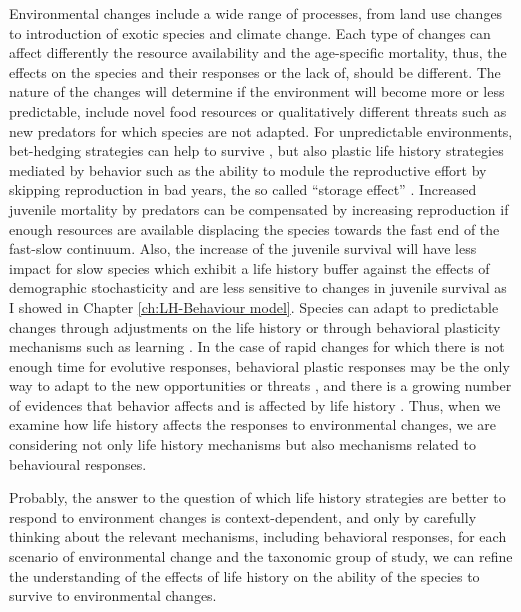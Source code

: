Environmental changes include a wide range of processes, from land use changes
to introduction of exotic species and climate change. Each type of changes can
affect differently the resource availability and the age-specific mortality,
thus, the effects on the species and their responses or the lack of, should be
different. The nature of the changes will determine if the environment will
become more or less predictable, include novel food resources or qualitatively
different threats such as new predators for which species are not adapted.
For unpredictable environments, bet-hedging strategies can help to survive
\citep{Starrfelt2012}, but also plastic life history strategies mediated by
behavior such as the ability to module the reproductive effort by skipping
reproduction in bad years, the so called ``storage effect'' \citep{Forcada2008}.
Increased juvenile mortality by predators can be compensated by increasing
reproduction if enough resources are available \citep{Yeh2004} displacing the
species towards the fast end of the fast-slow continuum. Also, the increase of
the juvenile survival will have less impact for slow species which exhibit a
life history buffer against the effects of demographic stochasticity and are
less sensitive to changes in juvenile survival as I showed in Chapter
\ref{ch:LH-Behaviour model}.
Species can adapt to predictable changes through adjustments on the life
history \citep{Evans2005} or through behavioral plasticity mechanisms such as
learning \citep{Laundre2001,Evans2012}.
In the case of rapid changes for which there is not enough time for evolutive
responses, behavioral plastic responses may be the only way to adapt to the
new opportunities or threats \citep{Sol2009}, and there is a growing number of
evidences that behavior affects and is affected by life history \citep{Sol2016}.
Thus, when we examine how life history affects the responses to environmental
changes, we are considering not only life history mechanisms but also mechanisms
related to behavioural responses.

Probably, the answer to the question of which life history strategies are
better to respond to environment changes is context-dependent, and only by
carefully thinking about the relevant mechanisms, including behavioral
responses, for each scenario of environmental change and the taxonomic group of
study, we can refine the understanding of the effects of life history on the
ability of the species to survive to environmental changes.


\clearpage

